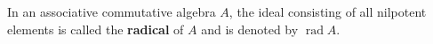 In an associative commutative algebra $A$, the ideal consisting of all nilpotent elements is called the \textbf{radical} of $A$ and is denoted by $\operatorname{rad} A$.
